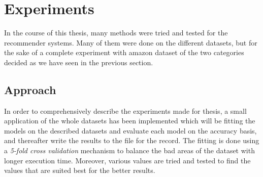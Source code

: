 





\section{Experiments}
In the course of this thesis, many methods were tried and tested for the recommender systems. Many of them were done on the different datasets, but for the sake of a complete experiment with amazon dataset of the two categories decided as we have seen in the previous section.

\subsection{Approach}
In order to comprehensively describe the experiments made for thesis, a small application of the whole datasets has been implemented which will be fitting the models on the described datasets and evaluate each model on the accuracy basis, and thereafter write the results to the file for the record. The fitting is done using a \textit{5-fold cross validation} mechanism to balance the bad areas of the dataset with longer execution time. Moreover, various values are tried and tested to find the values that are suited best for the better results. 

